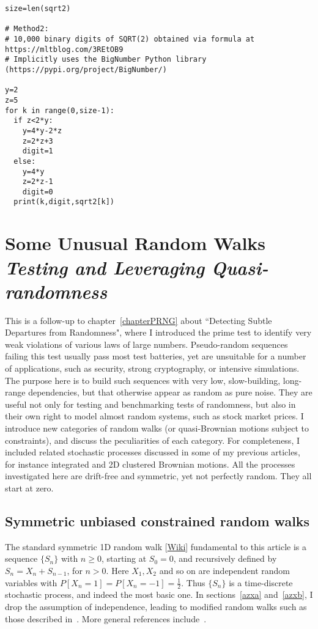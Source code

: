 \documentclass[oneside,10pt]{book}
\newcommand\Chapter[2]{
  \chapter[#1]{#1\\[2ex]\Large\itshape#2}
}
\begin{document}
\begin{lstlisting}
size=len(sqrt2)

# Method2:
# 10,000 binary digits of SQRT(2) obtained via formula at https://mltblog.com/3REtOB9
# Implicitly uses the BigNumber Python library (https://pypi.org/project/BigNumber/)

y=2
z=5
for k in range(0,size-1): 
  if z<2*y:
    y=4*y-2*z
    z=2*z+3
    digit=1 
  else:
    y=4*y
    z=2*z-1
    digit=0 
  print(k,digit,sqrt2[k])
\end{lstlisting}


\Chapter{Some Unusual Random Walks}{Testing and Leveraging Quasi-randomness}

This is a follow-up to chapter~\ref{chapterPRNG} about ``Detecting Subtle Departures from Randomness", where I introduced the prime test to identify very weak violations of
 various laws of large numbers. Pseudo-random sequences failing this test usually pass most test batteries, yet are unsuitable for a number of applications, such as security, strong cryptography, or intensive simulations. The purpose here is to build such sequences with very low, slow-building, long-range dependencies, but that otherwise appear as random as pure noise. They are useful not only for testing and benchmarking tests of randomness, but also in their own right to model almost random systems, such as stock market prices. I introduce new categories of random walks (or quasi-Brownian motions subject to constraints),  and discuss the peculiarities of each category. For completeness, I included related stochastic processes discussed in
 some of my previous articles, for instance integrated and 2D clustered Brownian motions. All the processes investigated here 
 are drift-free and symmetric, yet not perfectly random. They all start at zero.


\hypersetup{linkcolor=red}


\section{Symmetric unbiased constrained random walks}\label{pivizintrou}

The standard symmetric 1D \textcolor{index}{random walk} [\href{https://en.wikipedia.org/wiki/Random_walk}{Wiki}] fundamental to this article is a sequence $\{S_n\}$ with $n\geq 0$, starting at $S_0=0$, and recursively defined by 
$S_{n}=X_{n}+S_{n-1}$, for $n>0$.  Here $X_1,X_2$ and so on are independent random variables with $P[X_n=1]=P[X_n=-1]=\frac{1}{2}$. 
 Thus $\{S_n\}$ is a time-discrete stochastic process, and indeed the most basic one. In sections~\ref{azxa} and~\ref{azxb}, I drop the assumption
 of independence, leading to modified random walks such as those described in~\cite{nkrn2018,lanwu2012}.
More general references include~\cite{gtm2021,peresbrown}.
\end{document}
